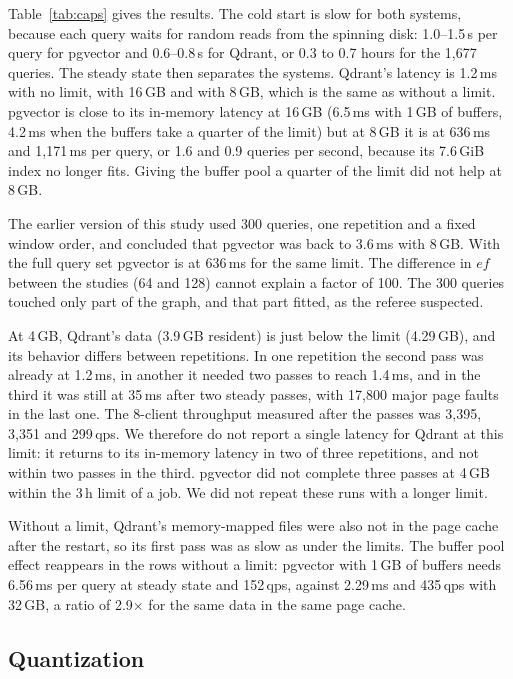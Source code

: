 \documentclass[sigconf, nonacm]{acmart}
\begin{document}
Table~\ref{tab:caps} gives the results. The cold start is slow for both systems, because each query waits for random reads from the
spinning disk: 1.0--1.5\,s per query for pgvector and 0.6--0.8\,s for Qdrant, or 0.3 to
0.7 hours for the 1{,}677 queries. The steady state then separates the systems. Qdrant's
latency is 1.2\,ms with no limit, with 16\,GB and with 8\,GB, which is the same as without
a limit. pgvector is close to its in-memory latency at 16\,GB (6.5\,ms with 1\,GB of
buffers, 4.2\,ms when the buffers take a quarter of the limit) but at 8\,GB it is at
636\,ms and 1{,}171\,ms per query, or 1.6 and 0.9 queries per second, because its 7.6\,GiB
index no longer fits. Giving the buffer pool a quarter of the limit did not help at 8\,GB.

The earlier version of this study used 300 queries, one repetition and a fixed window
order, and concluded that pgvector was back to 3.6\,ms with 8\,GB. With the full query set
pgvector is at 636\,ms for the same limit. The difference in $ef$ between the studies (64
and 128) cannot explain a factor of 100. The 300 queries touched only part of the graph,
and that part fitted, as the referee suspected.

At 4\,GB, Qdrant's data (3.9\,GB resident) is just below the limit (4.29\,GB), and its
behavior differs between repetitions. In one repetition the second pass was already at
1.2\,ms, in another it needed two passes to reach 1.4\,ms, and in the third it was still at
35\,ms after two steady passes, with 17{,}800 major page faults in the last one. The
8-client throughput measured after the passes was 3{,}395, 3{,}351 and 299\,qps. We
therefore do not report a single latency for Qdrant at this limit: it returns to its
in-memory latency in two of three repetitions, and not within two passes in the third.
pgvector did not complete three passes at 4\,GB within the 3\,h limit of a job. We did not
repeat these runs with a longer limit.

Without a limit, Qdrant's memory-mapped files were also not in the page cache after
the restart, so its first pass was as slow as under the limits. The buffer pool effect
reappears in the rows without a limit: pgvector with 1\,GB of buffers needs 6.56\,ms per
query at steady state and 152\,qps, against 2.29\,ms and 435\,qps with 32\,GB, a ratio of
2.9$\times$ for the same data in the same page cache.

\subsection{Quantization}
\label{sec:quant}
\end{document}
